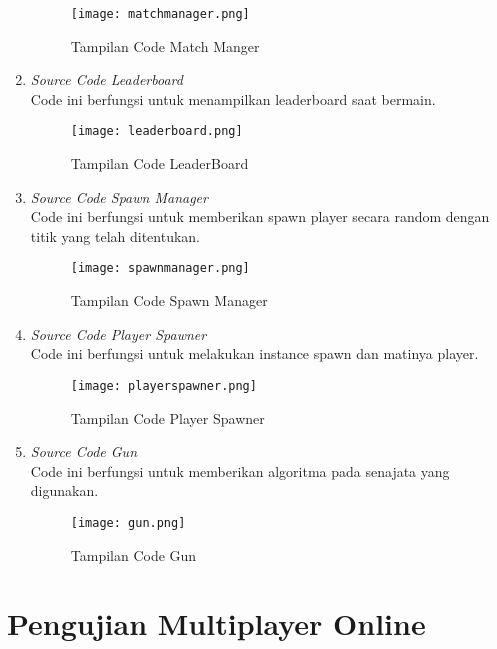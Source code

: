 \begin{enumerate}
    \newpage
    \begin{figure}[h]
        \centering
        \texttt{[image: matchmanager.png]}
        \caption{Tampilan Code Match Manger}
        \label{fig:matchmanager}
    \end{figure}
    \item \textit{Source Code Leaderboard} \\ 
    Code ini berfungsi untuk menampilkan leaderboard saat bermain.
    \begin{figure}[h]
        \centering
        \texttt{[image: leaderboard.png]}
        \caption{Tampilan Code LeaderBoard}
        \label{fig:leaderboard}
    \end{figure}
    \item \textit{Source Code Spawn Manager}\\
    Code ini berfungsi untuk memberikan spawn player secara random dengan titik yang telah ditentukan.
   \newpage
    \begin{figure}[h]
        \centering
        \texttt{[image: spawnmanager.png]}
        \caption{Tampilan Code Spawn Manager}
        \label{fig:spawnmanager}
    \end{figure}
    \item \textit{Source Code Player Spawner} \\ 
    Code ini berfungsi untuk melakukan instance spawn dan matinya player.
    \begin{figure}[h]
        \centering
        \texttt{[image: playerspawner.png]}
        \caption{Tampilan Code Player Spawner}
        \label{fig:playerspawner}
    \end{figure}
    \item \textit{Source Code Gun} \\ 
    Code ini berfungsi untuk memberikan algoritma pada senajata yang digunakan.
    \newpage
    \begin{figure}[h]
        \centering
        \texttt{[image: gun.png]}
        \caption{Tampilan Code Gun}
        \label{fig:gun}
    \end{figure}
\end{enumerate}

\section{Pengujian Multiplayer Online}

